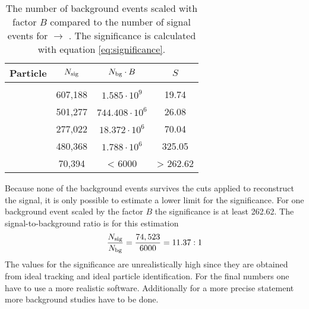 \begin{table}
	\centering
	\caption{\propose The number of background events scaled with factor $B$ compared to the number of signal events for \pbarp $\rightarrow$ \excitedcascade \anticascade.
		The significance is calculated with equation \ref{eq:significance}.}
	\label{bg_compared_reco_with_scaling}
	\begin{tabular}{lccc}
		\hline
		Particle & $N_{\textnormal{sig}}$ & $N_{\textnormal{bg}} \cdot B$ & $S$\\
		\hline
		\hline
		& & &\\
		\lam & 607,188 &$ 1.585 \cdot 10^{9}$& 19.74\\
		\alam & 501,277 & $ 744.408 \cdot 10^{6}$ & 26.08\\
		\anticascade & 277,022 & $ 18.372 \cdot 10^{6}$ & 70.04\\
		\excitedcascade &480,368  & $ 1.788 \cdot 10^{6}$& 325.05\\
		\excitedcascade \anticascade &  70,394 & < 6000 & > 262.62\\
		\hline
		 
		  
	\end{tabular}
\end{table}
Because none of the background events survives the cuts applied to reconstruct the signal, it is only possible to estimate a lower limit for the significance.
For one background event scaled by the factor $B$ the significance is at least 262.62.
The signal-to-background ratio is for this estimation
\begin{equation}
	\nonumber
	\frac{N_{\textnormal{sig}}}{N_{\textnormal{bg}}} = \frac{74,523} {6000} = 11.37 : 1
\end{equation}
The values for the significance are unrealistically high since they are obtained from ideal tracking and ideal particle identification.
For the final numbers one have to use a more realistic software.
Additionally for a more precise statement more background studies have to be done.
 
	